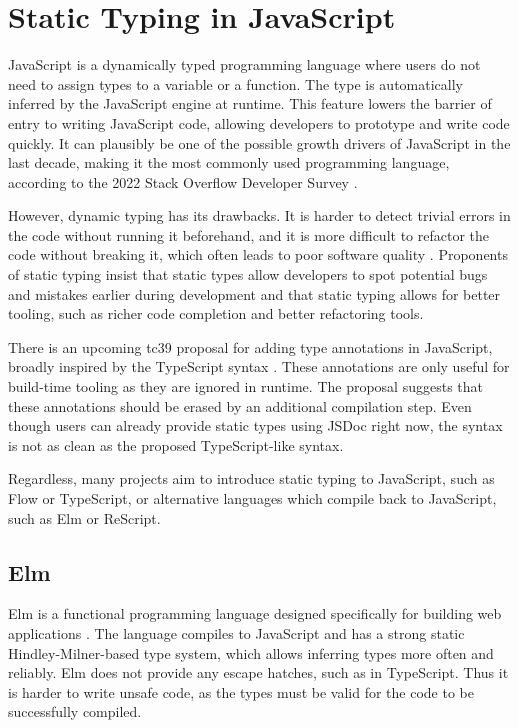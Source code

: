 \section{Static Typing in JavaScript}

JavaScript is a dynamically typed programming language where users do not need to assign types to a variable or a function. The type is automatically inferred by the JavaScript engine at runtime. This feature lowers the barrier of entry to writing JavaScript code, allowing developers to prototype and write code quickly. It can plausibly be one of the possible growth drivers of JavaScript in the last decade, making it the most commonly used programming language, according to the 2022 Stack Overflow Developer Survey \cite{StackOverflowDeveloper}.

However, dynamic typing has its drawbacks. It is harder to detect trivial errors in the code without running it beforehand, and it is more difficult to refactor the code without breaking it, which often leads to poor software quality \cite{schumacherConceptsProgrammingLanguages2015}. Proponents of static typing insist that static types allow developers to spot potential bugs and mistakes earlier during development and that static typing allows for better tooling, such as richer code completion and better refactoring tools.

There is an upcoming \acrshort{tc39} proposal for adding type annotations in JavaScript, broadly inspired by the TypeScript syntax \cite{ECMAScriptProposalType2023}. These annotations are only useful for build-time tooling as they are ignored in runtime. The proposal suggests that these annotations should be erased by an additional compilation step. Even though users can already provide static types using JSDoc right now, the syntax is not as clean as the proposed TypeScript-like syntax.

Regardless, many projects aim to introduce static typing to JavaScript, such as Flow or TypeScript, or alternative languages which compile back to JavaScript, such as Elm or ReScript.

\subsection{Elm}

Elm is a functional programming language designed specifically for building web applications \cite{ElmDelightfulLanguage}. The language compiles to JavaScript and has a strong static Hindley-Milner-based type system, which allows inferring types more often and reliably. Elm does not provide any escape hatches, such as  in TypeScript. Thus it is harder to write unsafe code, as the types must be valid for the code to be successfully compiled.

